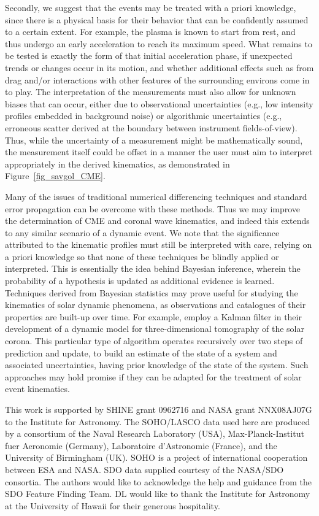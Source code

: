 \documentclass[structabstract]{aa}
\begin{document}
Secondly, we suggest that the events may be treated with a priori knowledge, since there is a physical basis for their behavior that can be confidently assumed to a certain extent. For example, the plasma is known to start from rest, and thus undergo an early acceleration to reach its maximum speed. What remains to be tested is exactly the form of that initial acceleration phase, if unexpected trends or changes occur in its motion, and whether additional effects such as from drag and/or interactions with other features of the surrounding environs come in to play. The interpretation of the measurements must also allow for unknown biases that can occur, either due to observational uncertainties (e.g., low intensity profiles embedded in background noise) or algorithmic uncertainties (e.g., erroneous scatter derived at the boundary between instrument fields-of-view). Thus, while the uncertainty of a measurement might be mathematically sound, the measurement itself could be offset in a manner the user must aim to interpret appropriately in the derived kinematics, as demonstrated in Figure~\ref{fig_savgol_CME}.

Many of the issues of traditional numerical differencing techniques and standard error propagation can be overcome with these methods. Thus we may improve the determination of CME and coronal wave kinematics, and indeed this extends to any similar scenario of a dynamic event. We note that the significance attributed to the kinematic profiles must still be interpreted with care, relying on a priori knowledge so that none of these techniques be blindly applied or interpreted. This is essentially the idea behind Bayesian inference, wherein the probability of a hypothesis is updated as additional evidence is learned. Techniques derived from Bayesian statistics may prove useful for studying the kinematics of solar dynamic phenomena, as observations and catalogues of their properties are built-up over time. For example, \citet{2010SoPh..262..495B} employ a Kalman filter in their development of a dynamic model for three-dimensional tomography of the solar corona. This particular type of algorithm operates recursively over two steps of prediction and update, to build an estimate of the state of a system and associated uncertainties, having prior knowledge of the state of the system. Such approaches may hold promise if they can be adapted for the treatment of solar event kinematics.


\begin{acknowledgements}
This work is supported by SHINE grant 0962716 and NASA grant NNX08AJ07G to the Institute for Astronomy. The SOHO/LASCO data used here are produced by a consortium of the Naval Research Laboratory (USA), Max-Planck-Institut fuer Aeronomie (Germany), Laboratoire d'Astronomie (France), and the University of Birmingham (UK). SOHO is a project of international cooperation between ESA and NASA. SDO data supplied courtesy of the NASA/SDO consortia. The authors would like to acknowledge the help and guidance from the SDO Feature Finding Team. DL would like to thank the Institute for Astronomy at the University of Hawaii for their generous hospitality. 
\end{acknowledgements}




  
\end{document}

